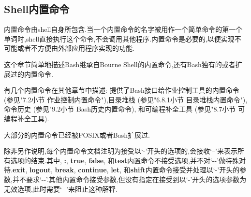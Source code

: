 \documentclass[draft,openany]{book}
\begin{document}
\begin{CJK}{UTF8}{gbsn}
    \chapter{Shell内置命令}
    内置命令由shell自身所包含.当一个内置命令的名字被用作一个简单命令的第一个单词时,shell直接执行这个命令,不会调用其他程序.内置命令是必要的,以便实现不可能或者不方便由外部应用程序实现的功能.\par
    这个章节简单地描述Bash继承自Bourne Shell的内置命令,还有Bash独有的或者扩展过的内置命令.\par
    有几个内置命令在其他章节中描述: 提供了Bash接口给作业控制工具的内置命令 (参见"7.2小节 作业控制内置命令"),目录堆栈 (参见"6.8.1小节 目录堆栈内置命令"), 命令历史 (参见"9.2小节 Bash历史内置命令), 和可编程补全工具 (参见"8.7小节 可编程补全工具).\par
    大部分的内置命令已经被POSIX或者Bash扩展过.\par
    除非另作说明,每个内置命令文档注明为接受以`-'开头的选项的,会接收`--'来表示所有选项的结束.其中, \textbf{:}, \textbf{true}, \textbf{false}, 和\textbf{test}内置命令不接受选项,并不对`-{}-'做特殊对待.\textbf{exit}, \textbf{logout}, \textbf{break}, \textbf{continue}, \textbf{let}, 和\textbf{shift}内置命令接受并处理以`-'开头的参数,并不要求`-{}-'.其他内置命令接受参数,但没有指定在接受到以`-'开头的选项参数为无效选项,此时需要`-{}-'来阻止这种解释.


\end{CJK}
\end{document}

